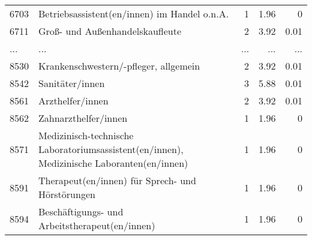 \begin{longtable}{lXrrr}
        6703 & \multicolumn{1}{X}{Betriebsassistent(en/innen) im Handel o.n.A.} & %
          \num{1} &
          \num[round-mode=places,round-precision=2]{1.96} &
          \num[round-mode=places,round-precision=2]{0} \\
        6711 & \multicolumn{1}{X}{Groß- und Außenhandelskaufleute} & %
          \num{2} &
          \num[round-mode=places,round-precision=2]{3.92} &
          \num[round-mode=places,round-precision=2]{0.01} \\
       ... & ... & ... & ... & ... \\
        8530 & \multicolumn{1}{X}{Krankenschwestern/-pfleger, allgemein} & %
          \num{2} &
          \num[round-mode=places,round-precision=2]{3.92} &
          \num[round-mode=places,round-precision=2]{0.01} \\

        8542 & \multicolumn{1}{X}{Sanitäter/innen} & %
          \num{3} &
          \num[round-mode=places,round-precision=2]{5.88} &
          \num[round-mode=places,round-precision=2]{0.01} \\

        8561 & \multicolumn{1}{X}{Arzthelfer/innen} & %
          \num{2} &
          \num[round-mode=places,round-precision=2]{3.92} &
          \num[round-mode=places,round-precision=2]{0.01} \\

        8562 & \multicolumn{1}{X}{Zahnarzthelfer/innen} & %
          \num{1} &
          \num[round-mode=places,round-precision=2]{1.96} &
          \num[round-mode=places,round-precision=2]{0} \\

        8571 & \multicolumn{1}{X}{Medizinisch-technische Laboratoriumsassistent(en/innen), Medizinische Laboranten(en/innen)} & %
          \num{1} &
          \num[round-mode=places,round-precision=2]{1.96} &
          \num[round-mode=places,round-precision=2]{0} \\

        8591 & \multicolumn{1}{X}{Therapeut(en/innen) für Sprech- und Hörstörungen} & %
          \num{1} &
          \num[round-mode=places,round-precision=2]{1.96} &
          \num[round-mode=places,round-precision=2]{0} \\

        8594 & \multicolumn{1}{X}{Beschäftigungs- und Arbeitstherapeut(en/innen)} & %
          \num{1} &
          \num[round-mode=places,round-precision=2]{1.96} &
          \num[round-mode=places,round-precision=2]{0} \\


\end{longtable}
